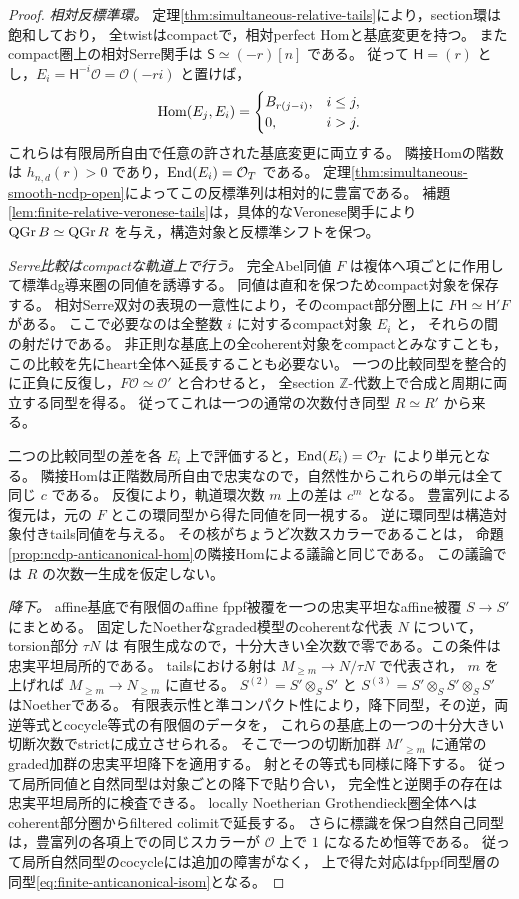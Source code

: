 \begin{proof}
\emph{相対反標準環。}
定理\ref{thm:simultaneous-relative-tails}により，section環は飽和しており，
全twistはcompactで，相対perfect Homと基底変更を持つ。
またcompact圏上の相対Serre関手は
$\mathsf S\simeq(-r)[n]$ である。
従って $\mathsf H=(r)$ とし，$E_i=\mathsf H^{-i}\mathcal O=\mathcal O(-ri)$ と置けば，
\[
 \operatorname{Hom}(E_j,E_i)=
 \begin{cases}B_{r(j-i)},&i\le j,\\0,&i>j.\end{cases}
\]
これらは有限局所自由で任意の許された基底変更に両立する。
隣接Homの階数は $h_{n,d}(r)>0$ であり，$\operatorname{End}(E_i)=\mathcal O_T$ である。
定理\ref{thm:simultaneous-smooth-ncdp-open}によってこの反標準列は相対的に豊富である。
補題\ref{lem:finite-relative-veronese-tails}は，具体的なVeronese関手により
$\operatorname{QGr} B\simeq\operatorname{QGr} R$ を与え，構造対象と反標準シフトを保つ。

\emph{Serre比較はcompactな軌道上で行う。}
完全Abel同値 $F$ は複体へ項ごとに作用して標準dg導来圏の同値を誘導する。
同値は直和を保つためcompact対象を保存する。
相対Serre双対の表現の一意性により，そのcompact部分圏上に
$F\mathsf H\simeq\mathsf H'F$ がある。
ここで必要なのは全整数 $i$ に対するcompact対象 $E_i$ と，
それらの間の射だけである。
非正則な基底上の全coherent対象をcompactとみなすことも，
この比較を先にheart全体へ延長することも必要ない。
一つの比較同型を整合的に正負に反復し，$F\mathcal O\simeq\mathcal O'$ と合わせると，
全section $\mathbb Z$-代数上で合成と周期に両立する同型を得る。
従ってこれは一つの通常の次数付き同型 $R\simeq R'$ から来る。

二つの比較同型の差を各 $E_i$ 上で評価すると，$\operatorname{End}(E_i)=\mathcal O_T$ により単元となる。
隣接Homは正階数局所自由で忠実なので，自然性からこれらの単元は全て同じ $c$ である。
反復により，軌道環次数 $m$ 上の差は $c^m$ となる。
豊富列による復元は，元の $F$ とこの環同型から得た同値を同一視する。
逆に環同型は構造対象付きtails同値を与える。
その核がちょうど次数スカラーであることは，
命題\ref{prop:ncdp-anticanonical-hom}の隣接Homによる議論と同じである。
この議論では $R$ の次数一生成を仮定しない。

\emph{降下。}
affine基底で有限個のaffine fppf被覆を一つの忠実平坦なaffine被覆 $S\to S'$ にまとめる。
固定したNoetherなgraded模型のcoherentな代表 $N$ について，torsion部分 $\tau N$ は
有限生成なので，十分大きい全次数で零である。この条件は忠実平坦局所的である。
tailsにおける射は $M_{\ge m}\to N/\tau N$ で代表され，
$m$ を上げれば $M_{\ge m}\to N_{\ge m}$ に直せる。
$S^{(2)}=S'\otimes_SS'$ と $S^{(3)}=S'\otimes_SS'\otimes_SS'$ はNoetherである。
有限表示性と準コンパクト性により，降下同型，その逆，両逆等式とcocycle等式の有限個のデータを，
これらの基底上の一つの十分大きい切断次数でstrictに成立させられる。
そこで一つの切断加群 $M'_{\ge m}$ に通常のgraded加群の忠実平坦降下を適用する。
射とその等式も同様に降下する。
従って局所同値と自然同型は対象ごとの降下で貼り合い，
完全性と逆関手の存在は忠実平坦局所的に検査できる。
locally Noetherian Grothendieck圏全体へはcoherent部分圏からfiltered colimitで延長する。
さらに標識を保つ自然自己同型は，豊富列の各項上での同じスカラーが
$\mathcal O$ 上で $1$ になるため恒等である。
従って局所自然同型のcocycleには追加の障害がなく，
上で得た対応はfppf同型層の同型\eqref{eq:finite-anticanonical-isom}となる。


\end{proof}
